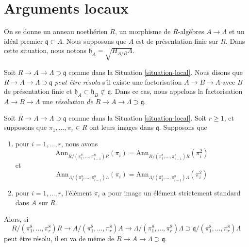 









\section{Arguments locaux}
\label{section-local}


\begin{situation}
\label{situation-local}
On se donne un anneau noethérien $R$, un morphisme de $R$-algèbres $A \to \Lambda$
et un idéal premier $\mathfrak q \subset \Lambda$. Nous supposons que $A$ est de
présentation finie sur $R$. Dans cette situation, nous notons
$\mathfrak h_A = \sqrt{H_{A/R} \Lambda}$.
\end{situation}

\noindent
Soit $R \to A \to \Lambda \supset \mathfrak q$ comme dans la
Situation \ref{situation-local}. Nous disons que
{\it $R \to A \to \Lambda \supset \mathfrak q$
peut être résolu} s'il existe une factorisation $A \to B \to \Lambda$
avec $B$ de présentation finie et
$\mathfrak h_A \subset \mathfrak h_B \not \subset \mathfrak q$.
Dans ce cas, nous appelons la factorisation $A \to B \to \Lambda$
une {\it résolution de $R \to A \to \Lambda \supset \mathfrak q$}.

\begin{lemma}
\label{lemma-lift-solution}
Soit $R \to A \to \Lambda \supset \mathfrak q$ comme dans la
Situation \ref{situation-local}. Soit $r \geq 1$, et supposons que
$\pi_1, \ldots, \pi_r \in R$ ont leurs images dans $\mathfrak q$. Supposons que
\begin{enumerate}
\item pour $i = 1, \ldots, r$, nous avons
$$
\text{Ann}_{R/(\pi_1^8, \ldots, \pi_{i - 1}^8)R}(\pi_i)
=
\text{Ann}_{R/(\pi_1^8, \ldots, \pi_{i - 1}^8)R}(\pi_i^2)
$$
et
$$
\text{Ann}_{\Lambda/(\pi_1^8, \ldots, \pi_{i - 1}^8)\Lambda}(\pi_i)
=
\text{Ann}_{\Lambda/(\pi_1^8, \ldots, \pi_{i - 1}^8)\Lambda}(\pi_i^2)
$$
\item pour $i = 1, \ldots, r$, l'élément $\pi_i$ a pour image un élément
strictement standard dans $A$ sur $R$.
\end{enumerate}
Alors, si
$$
R/(\pi_1^8, \ldots, \pi_r^8)R \to A/(\pi_1^8, \ldots, \pi_r^8)A
\to \Lambda/(\pi_1^8, \ldots, \pi_r^8)\Lambda \supset
\mathfrak q/(\pi_1^8, \ldots, \pi_r^8)\Lambda
$$
peut être résolu, il en va de même de $R \to A \to \Lambda \supset \mathfrak q$.
\end{lemma}

